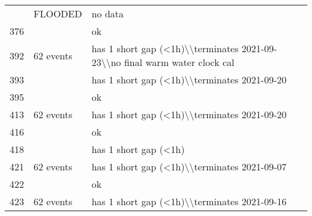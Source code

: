 \begin{longtable}{p{1cm}p{7cm}p{7cm}}
\bottomrule
\endlastfoot
345  &                                                                         FLOODED &                                                                                         no data \\
376  &                                                                                 &                                                                                              ok \\
392  &                                                                       62 events &                     has 1 short gap (<1h)\textbackslash \textbackslash terminates 2021-09-23\textbackslash \textbackslash no final warm water clock cal \\
393  &                                                                                 &                                                    has 1 short gap (<1h)\textbackslash \textbackslash terminates 2021-09-20 \\
395  &                                                                                 &                                                                                              ok \\
413  &                                                                       62 events &                                                    has 1 short gap (<1h)\textbackslash \textbackslash terminates 2021-09-20 \\
416  &                                                                                 &                                                                                              ok \\
418  &                                                                                 &                                                                           has 1 short gap (<1h) \\
421  &                                                                       62 events &                                                    has 1 short gap (<1h)\textbackslash \textbackslash terminates 2021-09-07 \\
422  &                                                                                 &                                                                                              ok \\
423  &                                                                       62 events &                                                    has 1 short gap (<1h)\textbackslash \textbackslash terminates 2021-09-16 \\

\end{longtable}
